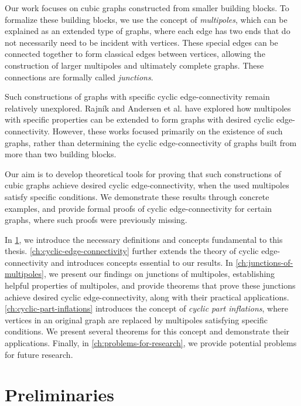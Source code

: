 \documentclass[12pt, twoside]{book}
\begin{document}
Our work focuses on cubic graphs constructed from smaller building blocks. To formalize these building blocks, we use the concept of \textit{multipoles}, which can be explained as an extended type of graphs, where each edge has two ends that do not necessarily need to be incident with vertices. These special edges can be connected together to form classical edges between vertices, allowing the construction of larger multipoles and ultimately complete graphs. These connections are formally called \textit{junctions}.

Such constructions of graphs with specific cyclic edge-connectivity remain relatively unexplored. Rajník \cite{Rajnik_phd} and Andersen et al. \cite{Andersen1988} have explored how multipoles with specific properties can be extended to form graphs with desired cyclic edge-connectivity. However, these works focused primarily on the existence of such graphs, rather than determining the cyclic edge-connectivity of graphs built from more than two building blocks.

Our aim is to develop theoretical tools for proving that such constructions of cubic graphs achieve desired cyclic edge-connectivity, when the used multipoles satisfy specific conditions. We demonstrate these results through concrete examples, and provide formal proofs of cyclic edge-connectivity for certain graphs, where such proofs were previously missing.

In \cref{ch:preliminaries}, we introduce the necessary definitions and concepts fundamental to this thesis. \cref{ch:cyclic-edge-connectivity} further extends the theory of cyclic edge-connectivity and introduces concepts essential to our results. In \cref{ch:junctions-of-multipoles}, we present our findings on junctions of multipoles, establishing helpful properties of multipoles, and provide theorems that prove these junctions achieve desired cyclic edge-connectivity, along with their practical applications. \cref{ch:cyclic-part-inflations} introduces the concept of \textit{cyclic part inflations}, where vertices in an original graph are replaced by multipoles satisfying specific conditions. We present several theorems for this concept and demonstrate their applications. Finally, in \cref{ch:problems-for-research}, we provide potential problems for future research.

\chapter{Preliminaries}\label{ch:preliminaries}
\end{document}

